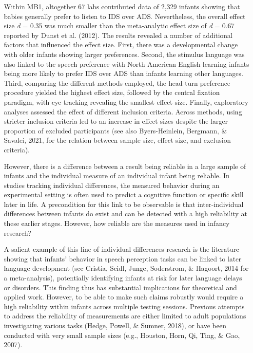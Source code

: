 \documentclass[
  man,floatsintext]{apa6}
\begin{document}
Within MB1, altogether 67 labs contributed data of 2,329 infants showing that babies generally prefer to listen to IDS over ADS. Nevertheless, the overall effect size \emph{d} = 0.35 was much smaller than the meta-analytic effect size of \emph{d} = 0.67 reported by Dunst et al. (2012). The results revealed a number of additional factors that influenced the effect size. First, there was a developmental change with older infants showing larger preferences. Second, the stimulus language was also linked to the speech preference with North American English learning infants being more likely to prefer IDS over ADS than infants learning other languages. Third, comparing the different methods employed, the head-turn preference procedure yielded the highest effect size, followed by the central fixation paradigm, with eye-tracking revealing the smallest effect size. Finally, exploratory analyses assessed the effect of different inclusion criteria. Across methods, using stricter inclusion criteria led to an increase in effect sizes despite the larger proportion of excluded participants (see also Byers-Heinlein, Bergmann, \& Savalei, 2021, for the relation between sample size, effect size, and exclusion criteria).

However, there is a difference between a result being reliable in a large sample of infants and the individual measure of an individual infant being reliable. In studies tracking individual differences, the measured behavior during an experimental setting is often used to predict a cognitive function or specific skill later in life. A precondition for this link to be observable is that inter-individual differences between infants do exist and can be detected with a high reliability at these earlier stages. However, how reliable are the measures used in infancy research?

A salient example of this line of individual differences research is the literature showing that infants' behavior in speech perception tasks can be linked to later language development (see Cristia, Seidl, Junge, Soderstrom, \& Hagoort, 2014 for a meta-analysis), potentially identifying infants at risk for later language delays or disorders. This finding thus has substantial implications for theoretical and applied work. However, to be able to make such claims robustly would require a high reliability within infants across multiple testing sessions. Previous attempts to address the reliability of measurements are either limited to adult populations investigating various tasks (Hedge, Powell, \& Sumner, 2018), or have been conducted with very small sample sizes (e.g., Houston, Horn, Qi, Ting, \& Gao, 2007).
\end{document}
